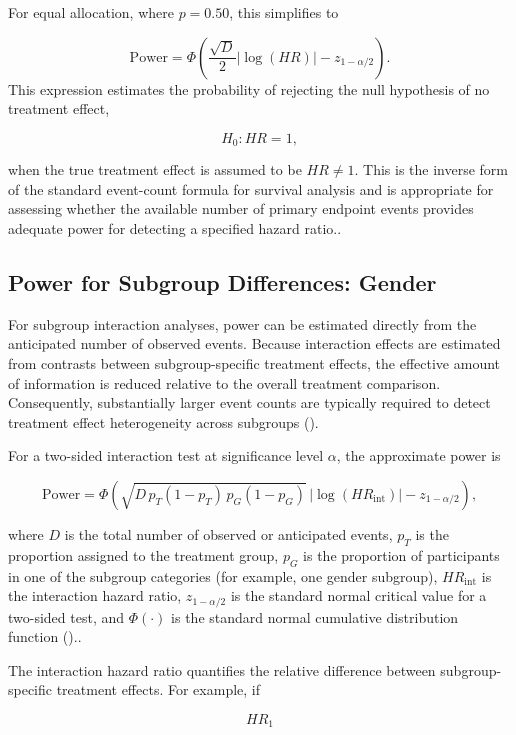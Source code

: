 \documentclass[
  letterpaper,
  DIV=11,
  numbers=noendperiod]{scrartcl}
\begin{document}
For equal allocation, where \(p = 0.50\), this simplifies to

\[
\text{Power}
=
\Phi\left(
\frac{\sqrt{D}}{2}|\log(HR)|
-
z_{1-\alpha/2}
\right).
\] This expression estimates the probability of rejecting the null
hypothesis of no treatment effect,

\[
H_0: HR = 1,
\]

when the true treatment effect is assumed to be \(HR \neq 1\). This is
the inverse form of the standard event-count formula for survival
analysis and is appropriate for assessing whether the available number
of primary endpoint events provides adequate power for detecting a
specified hazard ratio..

\subsection{Power for Subgroup Differences:
Gender}\label{power-for-subgroup-differences-gender}

For subgroup interaction analyses, power can be estimated directly from
the anticipated number of observed events. Because interaction effects
are estimated from contrasts between subgroup-specific treatment
effects, the effective amount of information is reduced relative to the
overall treatment comparison. Consequently, substantially larger event
counts are typically required to detect treatment effect heterogeneity
across subgroups ().

For a two-sided interaction test at significance level \(\alpha\), the
approximate power is

\[
\text{Power}
=
\Phi\left(
\sqrt{
D \,
p_T(1-p_T)\,
p_G(1-p_G)
}
\,
|\log(HR_{\text{int}})|
-
z_{1-\alpha/2}
\right),
\]

where \(D\) is the total number of observed or anticipated events,
\(p_T\) is the proportion assigned to the treatment group, \(p_G\) is
the proportion of participants in one of the subgroup categories (for
example, one gender subgroup), \(HR_{\text{int}}\) is the interaction
hazard ratio, \(z_{1-\alpha/2}\) is the standard normal critical value
for a two-sided test, and \(\Phi(\cdot)\) is the standard normal
cumulative distribution function ()..

The interaction hazard ratio quantifies the relative difference between
subgroup-specific treatment effects. For example, if

\[
HR_1
\]
\end{document}
